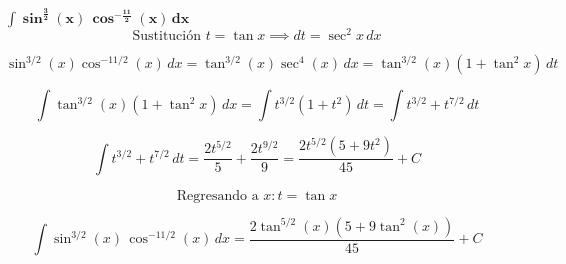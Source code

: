 $\displaystyle \mathbf{\int \sin^{\frac{3}{2}}(x)\,\cos^{-\frac{11}{2}}(x)\,dx}$
\nopagebreak
\[
\text{Sustitución } t = \tan x \implies dt = \sec^2 x\, dx
\]

\[
\sin^{3/2}(x)\cos^{-11/2}(x)\,dx = \tan^{3/2}(x) \sec^4(x)\, dx = \tan^{3/2}(x) (1+\tan^2 x)\, dt
\]

\[
\int \tan^{3/2}(x) (1+\tan^2 x)\, dx = \int t^{3/2} (1+t^2)\, dt = \int t^{3/2} + t^{7/2}\, dt
\]

\[
\int t^{3/2} + t^{7/2}\, dt = \frac{2 t^{5/2}}{5} + \frac{2 t^{9/2}}{9} = \frac{2 t^{5/2} (5 + 9 t^2)}{45} + C
\]

\[
\text{Regresando a } x: t = \tan x
\]

\[
\boxed{\displaystyle 
\int \sin^{3/2}(x)\,\cos^{-11/2}(x)\,dx = \frac{2 \tan^{5/2}(x) \left(5 + 9 \tan^2(x)\right)}{45} + C
}
\]
